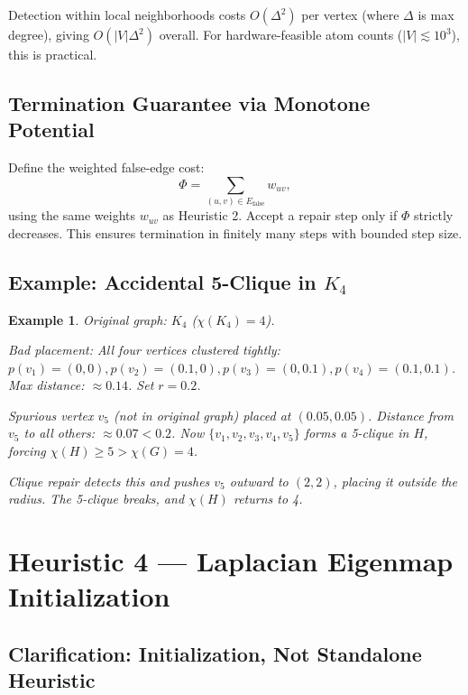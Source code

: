 \documentclass[11pt]{article}
\newtheorem{example}[theorem]{Example}
\newcommand{\Efalse}{E_{\mathrm{false}}}
\begin{document}
Detection within local neighborhoods costs $O(\Delta^2)$ per vertex (where
$\Delta$ is max degree), giving $O(|V|\Delta^2)$ overall. For hardware-feasible
atom counts ($|V| \lesssim 10^3$), this is practical.

\subsection{Termination Guarantee via Monotone Potential}

Define the weighted false-edge cost:
\[
  \Phi = \sum_{(u,v) \in \Efalse} w_{uv},
\]
using the same weights $w_{uv}$ as Heuristic 2. Accept a repair step only if
$\Phi$ strictly decreases. This ensures termination in finitely many steps
with bounded step size.

\subsection{Example: Accidental 5-Clique in $K_4$}

\begin{example}
Original graph: $K_4$ ($\chi(K_4) = 4$).

Bad placement: All four vertices clustered tightly:
$p(v_1) = (0, 0), p(v_2) = (0.1, 0), p(v_3) = (0, 0.1), p(v_4) = (0.1, 0.1)$.
Max distance: $\approx 0.14$. Set $r = 0.2$.

Spurious vertex $v_5$ (not in original graph) placed at $(0.05, 0.05)$.
Distance from $v_5$ to all others: $\approx 0.07 < 0.2$. Now $\{v_1, v_2, v_3,
v_4, v_5\}$ forms a 5-clique in $H$, forcing $\chi(H) \geq 5 > \chi(G) = 4$.

Clique repair detects this and pushes $v_5$ outward to $(2, 2)$, placing it
outside the radius. The 5-clique breaks, and $\chi(H)$ returns to 4.
\end{example}

\newpage

\section{Heuristic 4 — Laplacian Eigenmap Initialization}

\subsection{Clarification: Initialization, Not Standalone Heuristic}
\end{document}
